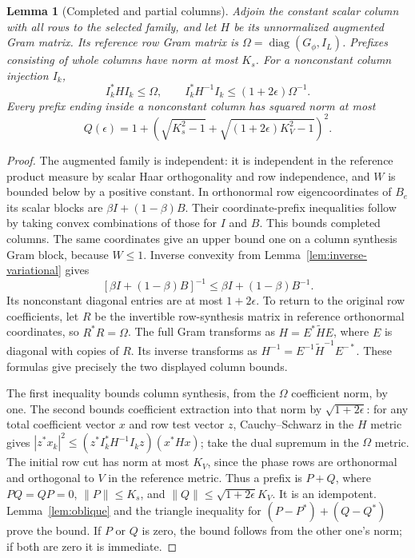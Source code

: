 \documentclass[reqno,a4paper,12pt]{amsart}
\newtheorem{lemma}[theorem]{Lemma}
\theoremstyle{definition}
\newcommand{\diag}{\operatorname{diag}}
\begin{document}
\begin{lemma}[Completed and partial columns]\label{lem:column-bounds}
Adjoin the constant scalar column with all rows to the selected
family, and let $H$ be its unnormalized augmented Gram matrix.
Its reference row Gram matrix is $\Omega=\diag(G_\phi,I_L)$.
Prefixes consisting of whole columns have norm at most $K_s$.
For a nonconstant column injection $I_k$,
\[
 I_k^*HI_k\le\Omega,\qquad
 I_k^*H^{-1}I_k\le(1+2\epsilon)\Omega^{-1}.
\]
Every prefix ending inside a nonconstant column has squared norm
at most
\[
 Q(\epsilon)=1+
 \left(\sqrt{K_s^2-1}+
 \sqrt{(1+2\epsilon)K_V^2-1}\right)^2.
\]
\end{lemma}
\begin{proof}
The augmented family is independent: it is independent in the
reference product measure by scalar Haar orthogonality and row
independence, and $W$ is bounded below by a positive constant.
In orthonormal row eigencoordinates of $B_e$ its scalar blocks are
$\beta I+(1-\beta)B$. Their coordinate-prefix inequalities follow
by taking convex combinations of those for $I$ and $B$.
This bounds completed columns.
The same coordinates give an upper bound one on a column synthesis
Gram block, because $W\le1$. Inverse convexity from
Lemma~\ref{lem:inverse-variational} gives
\[
 [\beta I+(1-\beta)B]^{-1}
 \le\beta I+(1-\beta)B^{-1}.
\]
Its nonconstant diagonal entries are at most $1+2\epsilon$.
To return to the original row coefficients, let $R$ be the
invertible row-synthesis matrix in reference orthonormal coordinates,
so $R^*R=\Omega$. The full Gram transforms as
$H=E^*\widetilde HE$, where $E$ is diagonal with copies of $R$.
Its inverse transforms as
$H^{-1}=E^{-1}\widetilde H^{-1}E^{-*}$.
These formulas give precisely the two displayed column bounds.

The first inequality bounds column synthesis, from the $\Omega$
coefficient norm, by one. The second bounds coefficient extraction
into that norm by $\sqrt{1+2\epsilon}$: for any total coefficient
vector $x$ and row test vector $z$, Cauchy--Schwarz in the $H$ metric
gives
$|z^*x_k|^2\le(z^*I_k^*H^{-1}I_kz)(x^*Hx)$;
take the dual supremum in the $\Omega$ metric.
The initial row cut has norm at most $K_V$, since the phase rows are
orthonormal and orthogonal to $V$ in the reference metric.
Thus a prefix is $P+Q$, where $PQ=QP=0$,
$\|P\|\le K_s$, and $\|Q\|\le\sqrt{1+2\epsilon}K_V$.
It is an idempotent. Lemma~\ref{lem:oblique} and the triangle
inequality for $(P-P^*)+(Q-Q^*)$ prove the bound.
If $P$ or $Q$ is zero, the bound follows from the other one's norm;
if both are zero it is immediate.
\end{proof}
\end{document}
